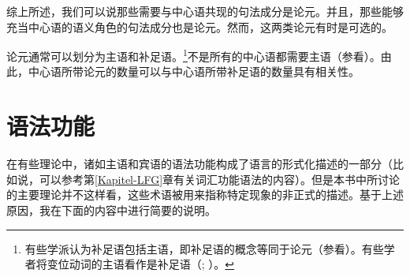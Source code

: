 综上所述，我们可以说那些需要与中心语共现的句法成分是论元。并且，那些能够充当中心语的语义角色的句法成分也是论元。然而，这两类论元有时是可选的。

论元通常可以划分为主语和补足语。\footnote{%
有些学派认为补足语包括主语，即补足语的概念等同于论元（参看\citealp[]{Gross2003a}）。有些学者将变位动词的主语看作是补足语（\citealp{Pollard90a-Eng}; \citealp[]{Eisenberg94b}）。}不是所有的中心语都需要主语（参看\citealp[\S~3.2]{MuellerLehrbuch1}）。由此，中心语所带论元的数量可以与中心语所带补足语的数量具有相关性。

\section{语法功能}
\label{Abschnitt-GF}
在有些理论中，诸如主语和宾语的语法功能构成了语言的形式化描述的一部分（比如说，可以参考第\ref{Kapitel-LFG}章有关词汇功能语法的内容）。但是本书中所讨论的主要理论并不这样看，这些术语被用来指称特定现象的非正式的描述。基于上述原因，我在下面的内容中进行简要的说明。

